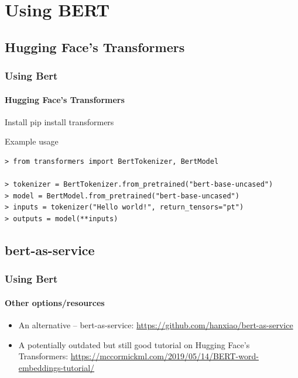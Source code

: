 \documentclass{beamer}
\begin{document}
%    

\section{Using BERT}
\subsection{Hugging Face's Transformers}
\begin{frame}[containsverbatim]
    \frametitle{Using Bert}
    \framesubtitle{Hugging Face's Transformers}
    \begin{block}{Install}
        pip install transformers    
    \end{block}
    \begin{block}{Example usage}
    \begin{lstlisting}
> from transformers import BertTokenizer, BertModel

> tokenizer = BertTokenizer.from_pretrained("bert-base-uncased")
> model = BertModel.from_pretrained("bert-base-uncased")
> inputs = tokenizer("Hello world!", return_tensors="pt")
> outputs = model(**inputs)    
    \end{lstlisting}
    \end{block}


\end{frame}

\subsection{bert-as-service}
\begin{frame}
    \frametitle{Using Bert}
    \framesubtitle{Other options/resources}
    \begin{itemize}
        \item An alternative -- bert-as-service: \href{https://github.com/hanxiao/bert-as-service}{https://github.com/hanxiao/bert-as-service}
        \item A potentially outdated but still good tutorial on Hugging Face's Transformers: \href{https://mccormickml.com/2019/05/14/BERT-word-embeddings-tutorial/}{https://mccormickml.com/2019/05/14/BERT-word-embeddings-tutorial/} 
    \end{itemize}
\end{frame}
\end{document}

